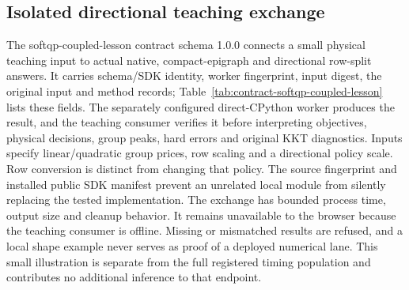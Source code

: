 \subsection{Isolated directional teaching exchange}\label{sec:contract-softqp-coupled-lesson}
The softqp-coupled-lesson contract schema 1.0.0 connects a small physical
teaching input to actual native, compact-epigraph and directional row-split
answers. It carries schema/SDK identity, worker fingerprint, input digest,
the original input and method records; Table~\ref{tab:contract-softqp-coupled-lesson}
lists these fields. The separately configured direct-CPython worker produces
the result, and the teaching consumer verifies it before interpreting
objectives, physical decisions, group peaks, hard errors and original KKT
diagnostics. Inputs specify linear/quadratic group prices, row scaling
and a directional policy scale. Row conversion is distinct from changing
that policy. The source fingerprint and installed public SDK manifest
prevent an unrelated local module from silently replacing the tested
implementation. The exchange has bounded process time, output size and
cleanup behavior. It remains unavailable to the browser because the
teaching consumer is offline. Missing or mismatched results are refused,
and a local shape example never serves as proof of a deployed numerical
lane. This small illustration is separate from the full registered timing
population and contributes no additional inference to that endpoint.

